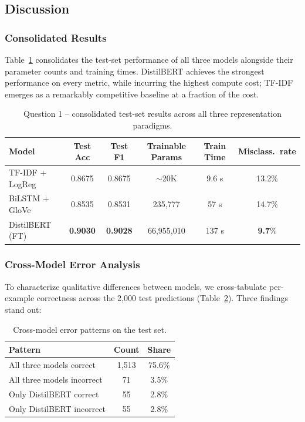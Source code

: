 \documentclass[11pt,a4paper]{article}
\begin{document}
\subsection{Discussion}
\label{sec:q1-discussion}

\subsubsection{Consolidated Results}

Table~\ref{tab:q1-summary} consolidates the test-set performance of all three models alongside their parameter counts and training times. DistilBERT achieves the strongest performance on every metric, while incurring the highest compute cost; TF-IDF emerges as a remarkably competitive baseline at a fraction of the cost.

\begin{table}[H]
\centering
\caption{Question 1 -- consolidated test-set results across all three representation paradigms.}
\label{tab:q1-summary}
\begin{tabular}{lccccc}
\toprule
\textbf{Model} & \textbf{Test Acc} & \textbf{Test F1} & \textbf{Trainable Params} & \textbf{Train Time} & \textbf{Misclass.\ rate} \\
\midrule
TF-IDF + LogReg     & 0.8675 & 0.8675 & $\sim$20K  & 9.6 s   & 13.2\% \\
BiLSTM + GloVe      & 0.8535 & 0.8531 & 235{,}777  & 57 s    & 14.7\% \\
DistilBERT (FT)     & \textbf{0.9030} & \textbf{0.9028} & 66{,}955{,}010 & 137 s   & \textbf{9.7}\% \\
\bottomrule
\end{tabular}
\end{table}

\subsubsection{Cross-Model Error Analysis}

To characterize qualitative differences between models, we cross-tabulate per-example correctness across the 2{,}000 test predictions (Table~\ref{tab:cross-error}). Three findings stand out:

\begin{table}[H]
\centering
\caption{Cross-model error patterns on the test set.}
\label{tab:cross-error}
\begin{tabular}{lcc}
\toprule
\textbf{Pattern} & \textbf{Count} & \textbf{Share} \\
\midrule
All three models correct          & 1{,}513 & 75.6\% \\
All three models incorrect        & 71      & 3.5\% \\
Only DistilBERT correct           & 55      & 2.8\% \\
Only DistilBERT incorrect         & 55      & 2.8\% \\
\bottomrule
\end{tabular}
\end{table}
\end{document}
